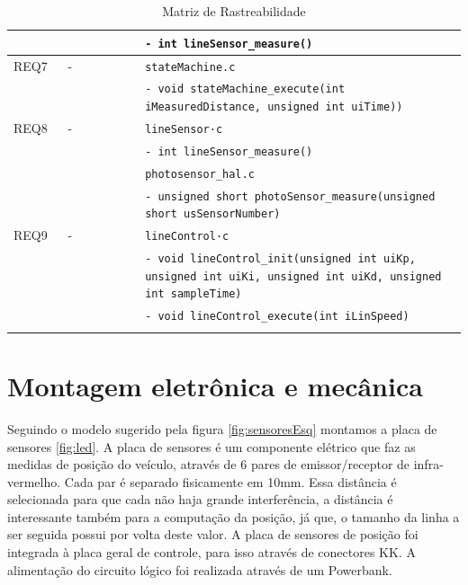 \documentclass{article}
\begin{document}
\begin{longtable}{|p{0.125\linewidth}|p{0.17\linewidth}|p{0.75\linewidth}|}
         && \texttt{- int lineSensor\_measure()}\\
         \hline
         REQ7 & - & \texttt{stateMachine.c}\\
         && \texttt{- void stateMachine\_execute(int iMeasuredDistance, unsigned int uiTime))}\\
         \hline
		 REQ8 & - & \texttt{lineSensor·c}\\
         && \texttt{- int lineSensor\_measure()}\\
         && \texttt{photosensor\_hal.c}\\
         && \texttt{- unsigned short photoSensor\_measure(unsigned short usSensorNumber)}\\
         \hline
         REQ9 & - & \texttt{lineControl·c}\\
         && \texttt{- void lineControl\_init(unsigned int uiKp, unsigned int uiKi, unsigned int uiKd, unsigned int sampleTime)}\\
         && \texttt{- void lineControl\_execute(int iLinSpeed)}\\
         \hline
    \caption{Matriz de Rastreabilidade}
	\label{tab:rastreabilidade}
\end{longtable}
\normalsize



\section{Montagem eletrônica e mecânica}
Seguindo o modelo sugerido pela figura \ref{fig:sensoresEsq} montamos a placa de sensores \ref{fig:led}. A placa de sensores é um componente elétrico que faz as medidas de posição do veículo, através de 6 pares de emissor/receptor de infra-vermelho. Cada par é separado fisicamente em 10mm. Essa distância é selecionada para que cada não haja grande interferência, a distância é interessante também para a computação da posição, já que, o tamanho da linha a ser seguida possui por volta deste valor.
A placa de sensores de posição foi integrada à placa geral de controle, para isso através de conectores KK. A alimentação do circuito lógico foi realizada através de um Powerbank.
\end{document}
